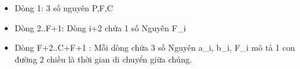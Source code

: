 \begin{itemize}
	\item     Dòng 1: 3 số nguyên P,F,C   
	\item     Dòng 2..F+1: Dòng i+2 chứa 1 số Nguyên F\_i   
	\item     Dòng F+2..C+F+1 : Mỗi dòng chứa 3 số Nguyên a\_i, b\_i, F\_i mô tả 1 con đường 2 chiều là thời gian di chuyển giữa chúng.   
\end{itemize}

\